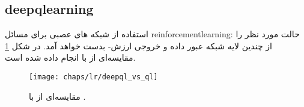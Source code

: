 \subsection{\gls{deepqlearning}}
استفاده از شبکه های عصبی برای مسائل \gls{reinforcementlearning}:
حالت مورد نظر را از چندین لایه شبکه عبور داده و خروجی ارزش- بدست خواهد آمد. در شکل \ref{fig:ch_lr:deepql_vs_ql} مقایسه‌ای از
  با 
  انجام داده شده است.
  \begin{figure}[!ht]
	\centerline{\texttt{[image: chaps/lr/deepql\_vs\_ql]}}
	\caption{مقایسه‌ای از  با .}
	\label{fig:ch_lr:deepql_vs_ql}
\end{figure} 
 